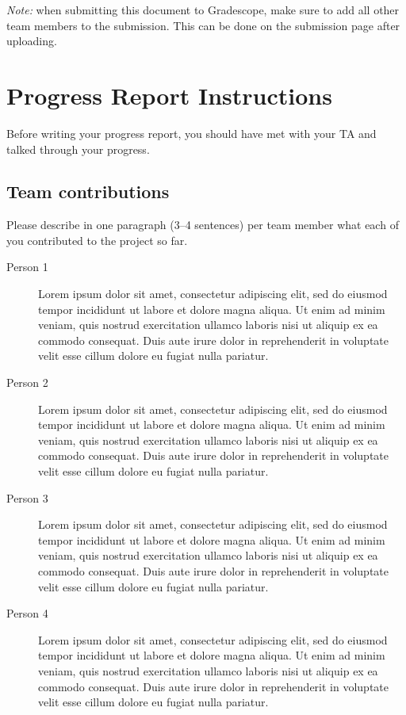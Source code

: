 \emph{Note:} when submitting this document to Gradescope, make sure to add all other team members to the submission. This can be done on the submission page after uploading.

\section*{Progress Report Instructions}

Before writing your progress report, you should have met with your TA and talked through your progress.

\subsection*{Team contributions}

Please describe in one paragraph (3--4 sentences) per team member what each of you contributed to the project so far.
\begin{description}
\item[Person 1] Lorem ipsum dolor sit amet, consectetur adipiscing elit, sed do eiusmod tempor incididunt ut labore et dolore magna aliqua. Ut enim ad minim veniam, quis nostrud exercitation ullamco laboris nisi ut aliquip ex ea commodo consequat. Duis aute irure dolor in reprehenderit in voluptate velit esse cillum dolore eu fugiat nulla pariatur. 
\item[Person 2] Lorem ipsum dolor sit amet, consectetur adipiscing elit, sed do eiusmod tempor incididunt ut labore et dolore magna aliqua. Ut enim ad minim veniam, quis nostrud exercitation ullamco laboris nisi ut aliquip ex ea commodo consequat. Duis aute irure dolor in reprehenderit in voluptate velit esse cillum dolore eu fugiat nulla pariatur.
\item [Person 3] Lorem ipsum dolor sit amet, consectetur adipiscing elit, sed do eiusmod tempor incididunt ut labore et dolore magna aliqua. Ut enim ad minim veniam, quis nostrud exercitation ullamco laboris nisi ut aliquip ex ea commodo consequat. Duis aute irure dolor in reprehenderit in voluptate velit esse cillum dolore eu fugiat nulla pariatur. 
\item [Person 4] Lorem ipsum dolor sit amet, consectetur adipiscing elit, sed do eiusmod tempor incididunt ut labore et dolore magna aliqua. Ut enim ad minim veniam, quis nostrud exercitation ullamco laboris nisi ut aliquip ex ea commodo consequat. Duis aute irure dolor in reprehenderit in voluptate velit esse cillum dolore eu fugiat nulla pariatur.
\end{description}

